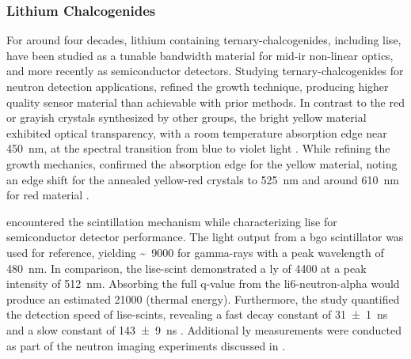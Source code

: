 \documentclass[../../../../main.tex]{subfiles}%
\begin{document}
%
    \subsubsection{Lithium Chalcogenides}%
    \label{sec:chapter-2:scintillator-detectors:ceramics:lithium-chalcogenides}%
    For around four decades, lithium containing \glspl{ternary-chalcogenide}, including \gls{lise}, have been studied as a tunable bandwidth material for \gls{mid-ir} non-linear optics, and more recently as semiconductor detectors.    
    Studying \glspl{ternary-chalcogenide} for neutron detection applications, \citeauthor*{Tupitsyn_2012} refined the growth technique, producing higher quality sensor material than achievable with prior methods.
    In contrast to the red or grayish crystals synthesized by other groups, the bright yellow material exhibited optical transparency, with a room temperature absorption edge near \SI{450}{\nano\meter}, at the spectral transition from blue to violet light \cite{Tupitsyn_2012}.
    While refining the growth mechanics, \citeauthor*{Tupitsyn_2014} confirmed the absorption edge for the yellow material, noting an edge shift for the annealed yellow-red crystals to \SI{525}{\nano\meter} and around \SI{610}{\nano\meter} for red material \cite{Tupitsyn_2014}.
    \par%
    \citeauthor*{Wiggins_2015} encountered the scintillation mechanism while characterizing \gls{lise} for semiconductor detector performance.
    The light output from a \gls{bgo} scintillator was used for reference, yielding \SI{9000}[\sim]{\lightyield} for \glspl{gamma-ray} with a peak wavelength of \SI{480}{\nano\meter}.
    In comparison, the \gls{lise-scint} demonstrated a \gls{ly} of \SI{4400}{\lightyield} at a peak intensity of \SI{512}{\nano\meter}.
    Absorbing the full \gls{q-value} from the \gls{li6-neutron-alpha} would produce an estimated \SI{21000}{\lightyieldneutron} (thermal energy).
    Furthermore, the study quantified the detection speed of \glspl{lise-scint}, revealing a fast decay constant of \SI{31(1)}{\nano\second} and a slow constant of \SI{143(9)}{\nano\second} \citeyear*{Wiggins_2015}.
    Additional \gls{ly} measurements were conducted as part of the neutron imaging experiments discussed in  \cite{Lukosi_2016a, Lukosi_2017}.
\end{document}
